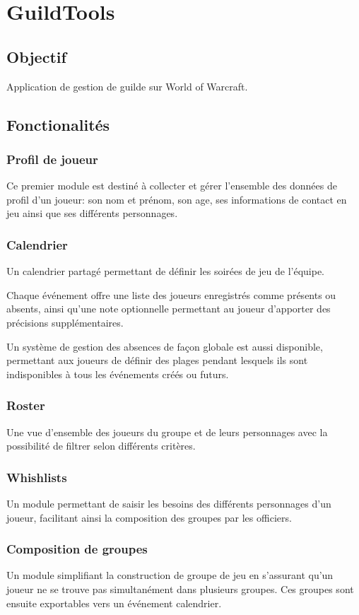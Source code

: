 \chapter{GuildTools}

\section{Objectif}

Application de gestion de guilde sur World of Warcraft.

\section{Fonctionalités}

	\subsection{Profil de joueur}

	Ce premier module est destiné à collecter et gérer l'ensemble des données de profil d'un joueur: son nom et prénom, son age, ses informations de contact en jeu ainsi que ses différents personnages.

	\subsection{Calendrier}
	
	Un calendrier partagé permettant de définir les soirées de jeu de l'équipe. 
	
	Chaque événement offre une liste des joueurs enregistrés comme présents ou absents, ainsi qu'une note optionnelle permettant au joueur d'apporter des précisions supplémentaires.
	
	Un système de gestion des absences de façon globale est aussi disponible, permettant aux joueurs de définir des plages pendant lesquels ils sont indisponibles à tous les événements créés ou futurs.
	
	\subsection{Roster}
	
	Une vue d'ensemble des joueurs du groupe et de leurs personnages avec la possibilité de filtrer selon différents critères.
	
	\subsection{Whishlists}
	
	Un module permettant de saisir les besoins des différents personnages d'un joueur, facilitant ainsi la composition des groupes par les officiers.
	
	\subsection{Composition de groupes}
	
	Un module simplifiant la construction de groupe de jeu en s'assurant qu'un joueur ne se trouve pas simultanément dans plusieurs groupes. Ces groupes sont ensuite exportables vers un événement calendrier.
	